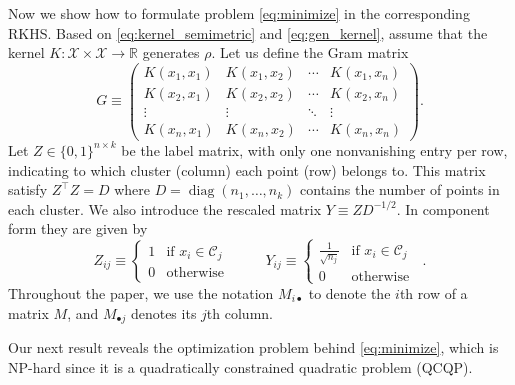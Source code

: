 \documentclass[aps,preprint,nofootinbib,floatfix]{revtex4-1}
\DeclareMathOperator{\diag}{diag}
\newcommand\kk{K}
\newcommand\C{{\mathcal{C}}}
\newcommand\Zt{Y}
\begin{document}
Now we show how to formulate problem \eqref{eq:minimize} in the corresponding
RKHS.
Based on 
\eqref{eq:kernel_semimetric} and \eqref{eq:gen_kernel}, assume that 
the kernel $\kk: \mathcal{X} \times \mathcal{X} \to \mathbb{R}$ 
generates $\rho$. 
Let us define  the Gram matrix
\begin{equation}
\label{eq:kernel_matrix}
G \equiv \begin{pmatrix}
\kk(x_1,x_1) & \kk(x_1,x_2) & \dotsm & \kk(x_1,x_n) \\
\kk(x_2,x_1) & \kk(x_2,x_2) & \dotsm & \kk(x_2,x_n) \\
\vdots & \vdots & \ddots  & \vdots \\
\kk(x_n,x_1) & \kk(x_n,x_2) & \dotsm & \kk(x_n,x_n) 
\end{pmatrix} .
\end{equation}
Let $Z \in \{ 0,1 \}^{n\times k}$ be the label matrix, 
with only one nonvanishing entry per row, 
indicating to which cluster (column)
each point (row) belongs to. This matrix satisfy
$Z^\top Z = D$ where $D = \diag( n_1,\dotsc, n_k )$  contains
the number of points in each cluster. We also introduce the rescaled
matrix  $Y \equiv Z D^{-1/2}$. In component form they are given by
\begin{equation}
\label{eq:label_matrix}
Z_{ij} \equiv \begin{cases}
1 & \mbox{if $x_i \in \C_j$ } \\
0 & \mbox{otherwise}
\end{cases} \qquad
\Zt_{ij} \equiv \begin{cases}
\tfrac{1}{\sqrt{n_j}} & \mbox{if $x_i \in \C_j$ } \\
0 & \mbox{otherwise}
\end{cases} .
\end{equation}
Throughout the paper, we use the notation $M_{i\bullet}$ to denote
the $i$th row of a matrix $M$, and $M_{\bullet j}$ denotes its $j$th column.

Our next result reveals the optimization problem behind \eqref{eq:minimize},
which is NP-hard since
it is a quadratically constrained quadratic problem (QCQP).
\end{document}
